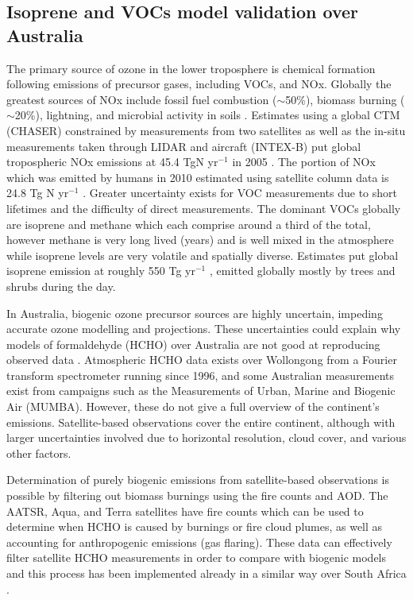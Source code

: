 \subsection{Isoprene and VOCs model validation over Australia}
The primary source of ozone in the lower troposphere is chemical formation following emissions of precursor gases, including VOCs, and NOx.
Globally the greatest sources of NOx include fossil fuel combustion ($\sim$50\%), biomass burning ($\sim$20\%), lightning, and microbial activity in soils \citep{Delmas_1997}.
Estimates using a global CTM (CHASER) constrained by measurements from two satellites as well as the in-situ measurements taken through LIDAR and aircraft (INTEX-B) put global tropospheric NOx emissions at 45.4 TgN yr$^{-1}$ in 2005 \cite{Miyazaki_2011}.
The portion of NOx which was emitted by humans in 2010 estimated using satellite column data is 24.8 Tg N yr$^{-1}$ \cite{Streets_2013}.
Greater uncertainty exists for VOC measurements due to short lifetimes and the difficulty of direct measurements.
The dominant VOCs globally are isoprene and methane which each comprise around a third of the total, however methane is very long lived (years) and is well mixed in the atmosphere while isoprene levels are very volatile and spatially diverse.
Estimates put global isoprene emission at roughly 550 Tg yr$^{-1}$ \cite{Guenther_2006, Monks_2014}, emitted globally mostly by trees and shrubs during the day.

In Australia, biogenic ozone precursor sources are highly uncertain, impeding accurate ozone modelling and projections. These uncertainties could explain why models of formaldehyde (HCHO) over Australia are not good at reproducing observed data \cite{Stavrakou_2009}. Atmospheric HCHO data exists over Wollongong from a Fourier transform spectrometer running since 1996, and some Australian measurements exist from campaigns such as the Measurements of Urban, Marine and Biogenic Air (MUMBA).
However, these do not give a full overview of the continent's emissions. Satellite-based observations cover the entire continent, although with larger uncertainties involved due to horizontal resolution, cloud cover, and various other factors. 

Determination of purely biogenic emissions from satellite-based observations is possible by filtering out biomass burnings using the fire counts and AOD.
The AATSR, Aqua, and Terra satellites have fire counts which can be used to determine when HCHO is caused by burnings or fire cloud plumes, as well as accounting for anthropogenic emissions (gas flaring).
These data can effectively filter satellite HCHO measurements in order to compare with biogenic models and this process has been implemented already in a similar way over South Africa \cite{Marais_2012}.

